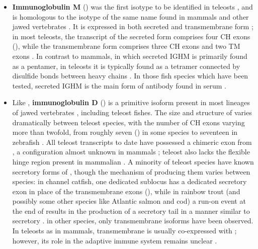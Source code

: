 \begin{itemize}
\item \textbf{Immunoglobulin M} () was the first \igh{} isotype to be identified in teleosts \parencite{fillatreau2013astonishing}, and is homologous to the isotype of the same name found in mammals and other jawed vertebrates \parencite{mashoof2016immunoglobulins}. It is expressed in both secreted and transmembrane form \parencite{fillatreau2013astonishing}; in most teleosts, the transcript of the secreted form comprises four CH exons (), while the transmembrane form comprises three CH exons and two TM exons \parencite{bengten2015fishantibodies,fillatreau2013astonishing}. In contrast to mammals, in which secreted IGHM is primarily found as a pentamer, in teleosts it is typically found as a tetramer \parencite{fillatreau2013astonishing} connected by disulfide bonds between heavy chains \parencite{mashoof2016immunoglobulins}. In those fish species which have been tested, secreted IGHM is the main form of antibody found in serum \parencite{bengten2015fishantibodies,mashoof2016immunoglobulins,fillatreau2013astonishing}.

\item Like , \textbf{immunoglobulin D} () is a primitive isoform present in most lineages of jawed vertebrates \parencite{mashoof2016immunoglobulins}, including teleost fishes. The size and structure of  varies dramatically between teleost species, with the number of CH exons varying more than twofold, from roughly seven () in some species to seventeen in zebrafish \parencite{mashoof2016immunoglobulins,fillatreau2013astonishing}. All teleost  transcripts to date have possessed a chimeric  exon from , a configuration almost unknown in mammals \parencite{mashoof2016immunoglobulins,fillatreau2013astonishing}; teleost  also lacks the flexible hinge region present in mammalian  \parencite{fillatreau2013astonishing}. A minority of teleost species have known secretory forms of , though the mechanism of producing them varies between species: in channel catfish, one dedicated sublocus has a dedicated  secretory exon in place of the transmembrane exons \parencite{bengten2006catfish} (), while in rainbow trout (and possibly some other species like Atlantic salmon and cod) a run-on event at the end of  results in the production of a secretory tail in a manner similar to secretory  \parencite{ramirezgomez2012secretoryigd}. in other species, only transmembrane isoforms have been observed. In teleosts as in mammals, transmembrane  is usually co-expressed with ; however, its role in the adaptive immune system remains unclear \parencite{mashoof2016immunoglobulins}.


\end{itemize}
